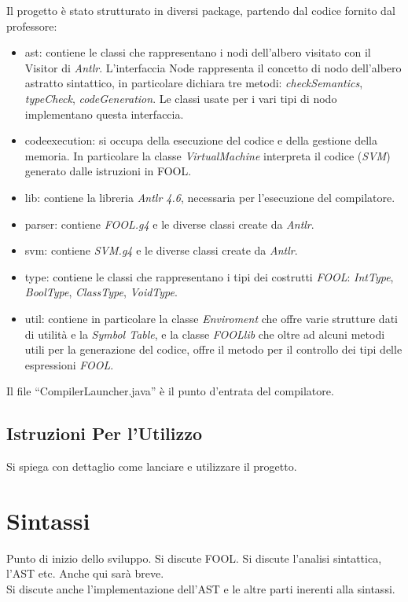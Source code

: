 \documentclass{scrreprt}
\begin{document}
Il progetto è stato strutturato in diversi package, partendo dal codice fornito dal professore:
\begin{itemize}
    \item ast: contiene le classi che rappresentano i nodi dell'albero visitato con il Visitor di \textit{Antlr}. 
            L'interfaccia Node rappresenta il concetto di nodo dell'albero astratto sintattico, in particolare dichiara tre metodi:
            \textit{checkSemantics}, \textit{typeCheck}, \textit{codeGeneration}. Le classi usate per i vari tipi di nodo implementano questa interfaccia.
    \item codeexecution: si occupa della esecuzione del codice e della gestione della memoria. In particolare la classe \textit{VirtualMachine} interpreta il codice (\textit{SVM}) generato dalle istruzioni in FOOL.
    \item lib: contiene la libreria \textit{Antlr 4.6}, necessaria per l'esecuzione del compilatore.
    \item parser: contiene \textit{FOOL.g4} e le diverse classi create da \textit{Antlr}.
    \item svm:  contiene \textit{SVM.g4} e le diverse classi create da \textit{Antlr}.
    \item type: contiene le classi che rappresentano i tipi dei costrutti \textit{FOOL}: \textit{IntType}, \textit{BoolType}, \textit{ClassType}, \textit{VoidType}.
    \item util: contiene in particolare la classe \textit{Enviroment} che offre varie strutture dati di utilità e la \textit{Symbol Table}, e la classe \textit{FOOLlib} che oltre ad alcuni metodi utili
            per la generazione del codice, offre il metodo  per il controllo dei tipi delle espressioni \textit{FOOL}.
\end{itemize}

Il file ``CompilerLauncher.java'' è il punto d'entrata del compilatore.

\section{Istruzioni Per l'Utilizzo}
Si spiega con dettaglio come lanciare e utilizzare il progetto.

\chapter{Sintassi}
Punto di inizio dello sviluppo. Si discute FOOL.
Si discute l'analisi sintattica, l'AST etc. Anche qui sarà breve.\\
Si discute anche l'implementazione dell'AST e le altre parti inerenti alla sintassi.
\end{document}
